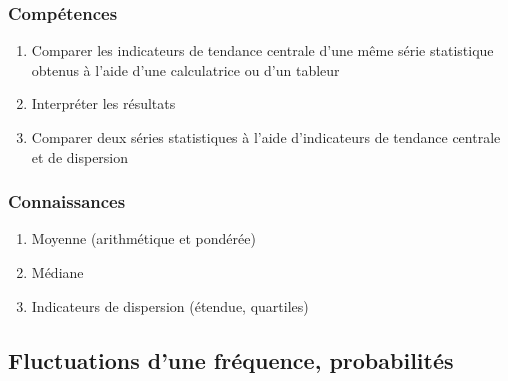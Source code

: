 \documentclass[12pt,a4paper]{article}
\begin{document}

\begin{multicols}{2}	
\subsubsection*{Compétences}
	\begin{enumerate}
		\item Comparer les indicateurs de tendance centrale d'une même série statistique obtenus à l'aide d'une calculatrice ou d'un tableur
		\item Interpréter les résultats
		\item Comparer deux séries statistiques à l'aide d'indicateurs de tendance centrale et de dispersion
	\end{enumerate}

\subsubsection*{Connaissances}
	\begin{enumerate}
		\item Moyenne (arithmétique et pondérée)
		\item Médiane
		\item Indicateurs de dispersion (étendue, quartiles)
	\end{enumerate}
\end{multicols}

\subsection{Fluctuations d'une fréquence, probabilités}
\end{document}

